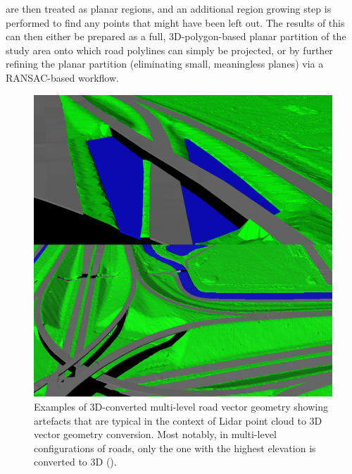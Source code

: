are then treated as planar regions, and an additional region growing step is performed to find any points that might have been left out. The results of this can then either be prepared as a full, 3D-polygon-based planar partition of the study area onto which road polylines can simply be projected, or by further refining the planar partition (eliminating small, meaningless planes) via a RANSAC-based workflow.
\begin{figure}
    \includegraphics[width=\linewidth]{p2/figs/oudeElberink_vosselman_2006_03.png} 
    \caption{Examples of 3D-converted multi-level road vector geometry showing artefacts that are typical in the context of Lidar point cloud to 3D vector geometry conversion. Most notably, in multi-level configurations of roads, only the one with the highest elevation is converted to 3D (\cite{oudeElberink_vosselman_2006}).}
    \label{fig:conversionartefacts}
\end{figure}
